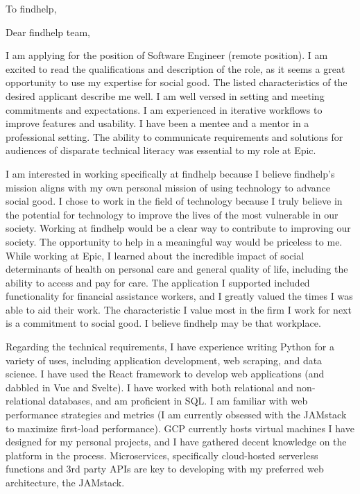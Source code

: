 \documentclass[a4paper, 10pt]{letter}
\begin{document}
	\begin{letter}
	{
	    To findhelp,\\
	}

		    \opening{Dear findhelp team,}

			I am applying for the position of Software Engineer (remote position). I am excited to read the qualifications and description of the role, as it seems a great opportunity to use my expertise for social good. The listed characteristics of the desired applicant describe me well. I am well versed in setting and meeting commitments and expectations. I am experienced in iterative workflows to improve features and usability. I have been a mentee and a mentor in a professional setting. The ability to communicate requirements and solutions for audiences of disparate technical literacy was essential to my role at Epic.

			I am interested in working specifically at findhelp because I believe findhelp's mission aligns with my own personal mission of using technology to advance social good. I chose to work in the field of technology because I truly believe in the potential for technology to improve the lives of the most vulnerable in our society. Working at findhelp would be a clear way to contribute to improving our society. The opportunity to help in a meaningful way would be priceless to me. While working at Epic, I learned about the incredible impact of social determinants of health on personal care and general quality of life, including the ability to access and pay for care. The application I supported included functionality for financial assistance workers, and I greatly valued the times I was able to aid their work. The characteristic I value most in the firm I work for next is a commitment to social good. I believe findhelp may be that workplace.    

			Regarding the technical requirements, I have experience writing Python for a variety of uses, including application development, web scraping, and data science. I have used the React framework to develop web applications (and dabbled in Vue and Svelte). I have worked with both relational and non-relational databases, and am proficient in SQL. I am familiar with web performance strategies and metrics (I am currently obsessed with the JAMstack to maximize first-load performance). GCP currently hosts virtual machines I have designed for my personal projects, and I have gathered decent knowledge on the platform in the process. Microservices, specifically cloud-hosted serverless functions and 3rd party APIs are key to developing with my preferred web architecture, the JAMstack. 


\end{letter}
\end{document}
